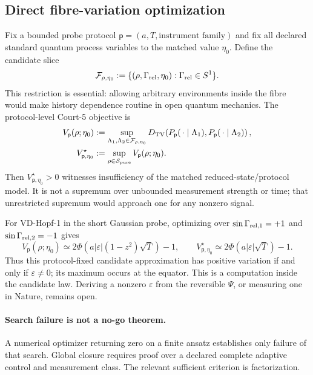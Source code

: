 \documentclass[10pt]{article}
\theoremstyle{definition}
\theoremstyle{remark}
\begin{document}
\subsection{Direct fibre-variation optimization}

Fix a bounded probe protocol
\(\mathsf p=(a,T,\text{instrument family})\)
and fix all declared standard quantum process variables to the matched value \(\eta_0\). Define the candidate slice
\[
\mathcal F_{\rho,\eta_0}
:=
\{(\rho,\Gamma_{\rm rel},\eta_0):
\Gamma_{\rm rel}\in S^1\}.
\]
This restriction is essential: allowing arbitrary environments inside the fibre would make history dependence routine in open quantum mechanics. The protocol-level Court-5 objective is
\begin{align}
  V_{\mathsf p}(\rho;\eta_0)
  &:=
  \sup_{\Lambda_1,\Lambda_2\in\mathcal F_{\rho,\eta_0}}
  D_{\rm TV}\!\left(
  P_{\mathsf p}(\,\cdot\mid\Lambda_1),
  P_{\mathsf p}(\,\cdot\mid\Lambda_2)
  \right),
  \label{eq:fibre-variation}\\
  V^\star_{\mathsf p,\eta_0}
  &:=
  \sup_{\rho\in\mathcal S_{\rm pure}}
  V_{\mathsf p}(\rho;\eta_0).
  \label{eq:global-fibre-variation}
\end{align}
Then \(V^\star_{\mathsf p,\eta_0}>0\) witnesses insufficiency of the matched reduced-state/protocol model. It is not a supremum over unbounded measurement strength or time; that unrestricted supremum would approach one for any nonzero signal.

For VD-Hopf-1 in the short Gaussian probe, optimizing over
\(\sin\Gamma_{{\rm rel},1}=+1\) and
\(\sin\Gamma_{{\rm rel},2}=-1\) gives
\begin{equation}
  V_{\mathsf p}(\rho;\eta_0)
  \simeq
  2\Phi\!\left(
  a|\varepsilon|(1-z^2)\sqrt T
  \right)-1,
  \qquad
  V^\star_{\mathsf p,\eta_0}
  \simeq
  2\Phi(a|\varepsilon|\sqrt T)-1.
  \label{eq:analytic-fibre-variation}
\end{equation}
Thus this protocol-fixed candidate approximation has positive variation if and only if
\(\varepsilon\neq0\); its maximum occurs at the equator. This is a computation inside the candidate law. Deriving a nonzero \(\varepsilon\) from the reversible \(\Psi\), or measuring one in Nature, remains open.

\paragraph{Search failure is not a no-go theorem.}
A numerical optimizer returning zero on a finite ansatz establishes only failure of that search. Global closure requires proof over a declared complete adaptive control and measurement class. The relevant sufficient criterion is factorization.
\end{document}
